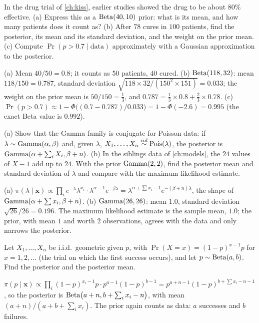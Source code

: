 \begin{exercise}
\label{ex:bayes-drug}
In the drug trial of \cref{ch:kiss}, earlier studies showed the drug to be about $80\%$ effective. (a) Express this as a $\mathrm{Beta}(40, 10)$ prior: what is its mean, and how many patients does it count as? (b) After $78$ cures in $100$ patients, find the posterior, its mean and its standard deviation, and the weight on the prior mean. (c) Compute $\Pr(p > 0.7 \mid \text{data})$ approximately with a Gaussian approximation to the posterior.
\end{exercise}
\begin{solution}
(a) Mean $40/50 = 0.8$; it counts as $50$ patients, $40$ cured. (b) $\mathrm{Beta}(118, 32)$: mean $118/150 = 0.787$, standard deviation $\sqrt{118 \times 32/(150^2 \times 151)} = 0.033$; the weight on the prior mean is $50/150 = \frac13$, and $0.787 = \frac13 \times 0.8 + \frac23 \times 0.78$. (c) $\Pr(p > 0.7) \approx 1 - \Phi\big((0.7 - 0.787)/0.033\big) = 1 - \Phi(-2.6) = 0.995$ (the exact Beta value is $0.992$).
\end{solution}

\begin{exercise}
\label{ex:bayes-siblings}
(a) Show that the Gamma family is conjugate for Poisson data: if $\lambda \sim \mathrm{Gamma}(\alpha, \beta)$ and, given $\lambda$, $X_1, \ldots, X_n \stackrel{iid}{\sim} \text{Pois}(\lambda)$, the posterior is $\mathrm{Gamma}(\alpha + \sum_i X_i, \beta + n)$. (b) In the siblings data of \cref{ch:models}, the $24$ values of $X - 1$ add up to $24$. With the prior $\mathrm{Gamma}(2, 2)$, find the posterior mean and standard deviation of $\lambda$ and compare with the maximum likelihood estimate.
\end{exercise}
\begin{solution}
(a) $\pi(\lambda \mid \mathbf{x}) \propto \prod_i e^{-\lambda}\lambda^{x_i} \cdot \lambda^{\alpha - 1}e^{-\beta\lambda} = \lambda^{\alpha + \sum x_i - 1}e^{-(\beta + n)\lambda}$, the shape of $\mathrm{Gamma}(\alpha + \sum x_i, \beta + n)$. (b) $\mathrm{Gamma}(26, 26)$: mean $1.0$, standard deviation $\sqrt{26}/26 = 0.196$. The maximum likelihood estimate is the sample mean, $1.0$; the prior, with mean $1$ and worth $2$ observations, agrees with the data and only narrows the posterior.
\end{solution}

\begin{exercise}
\label{ex:bayes-geometric}
Let $X_1, \ldots, X_n$ be i.i.d.\ geometric given $p$, with $\Pr(X = x) = (1 - p)^{x-1}p$ for $x = 1, 2, \ldots$ (the trial on which the first success occurs), and let $p \sim \mathrm{Beta}(a, b)$. Find the posterior and the posterior mean.
\end{exercise}
\begin{solution}
$\pi(p \mid \mathbf{x}) \propto \prod_i(1 - p)^{x_i - 1}p \cdot p^{a-1}(1 - p)^{b-1} = p^{a + n - 1}(1 - p)^{b + \sum x_i - n - 1}$, so the posterior is $\mathrm{Beta}\big(a + n, b + \sum_i x_i - n\big)$, with mean $(a + n)/(a + b + \sum_i x_i)$. The prior again counts as data: $a$ successes and $b$ failures.
\end{solution}

